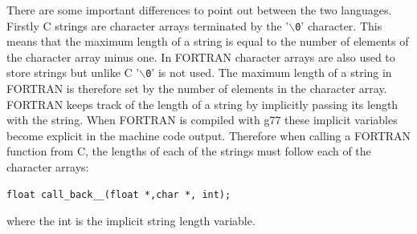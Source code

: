 \documentclass[11pt]{scrartcl}
\begin{document}
There are some important differences to point out between the two
languages.  Firstly C strings are character arrays terminated by the
'\texttt{$\backslash$0}' character.  This means that the maximum
length of a string is equal to the number of elements of the character
array minus one.  In FORTRAN character arrays are also used to store
strings but unlike C '\texttt{$\backslash$0}' is not used.  The
maximum length of a string in FORTRAN is therefore set by the number
of elements in the character array.  FORTRAN keeps track of the length
of a string by implicitly passing its length with the string.  When
FORTRAN is compiled with g77 these implicit variables become explicit
in the machine code output.  Therefore when calling a FORTRAN function
from C, the lengths of each of the strings must follow each of the
character arrays:
\begin{lstlisting}
float call_back__(float *,char *, int);
\end{lstlisting}
where the int is the implicit string length variable.
\end{document}

